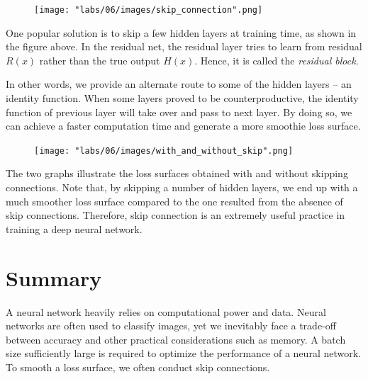 \begin{figure}[ht]
    \centering
    \texttt{[image: "labs/06/images/skip\_connection".png]}
\end{figure}

One popular solution is to skip a few hidden layers at training time, as shown in the figure above. In the residual net, the residual layer tries to learn from residual $R(x)$ rather than the true output $H(x)$. Hence, it is called the \textit{residual block}.

In other words, we provide an alternate route to some of the hidden layers -- an identity function. When some layers proved to be counterproductive, the identity function of previous layer will take over and pass to next layer. By doing so, we can achieve a faster computation time and generate a more smoothie loss surface.

\begin{figure}[!htb]
    \centering
    \texttt{[image: "labs/06/images/with\_and\_without\_skip".png]}
\end{figure}

The two graphs illustrate the loss surfaces obtained with and without skipping connections. Note that, by skipping a number of hidden layers, we end up with a much smoother loss surface compared to the one resulted from the absence of skip connections. Therefore, skip connection is an extremely useful practice in training a deep neural network.
\clearpage

\section{Summary}
A neural network heavily relies on computational power and data. Neural networks are often used to classify images, yet we inevitably face a trade-off between accuracy and other practical considerations such as memory. A batch size sufficiently large is required to optimize the performance of a neural network. To smooth a loss surface, we often conduct skip connections.
